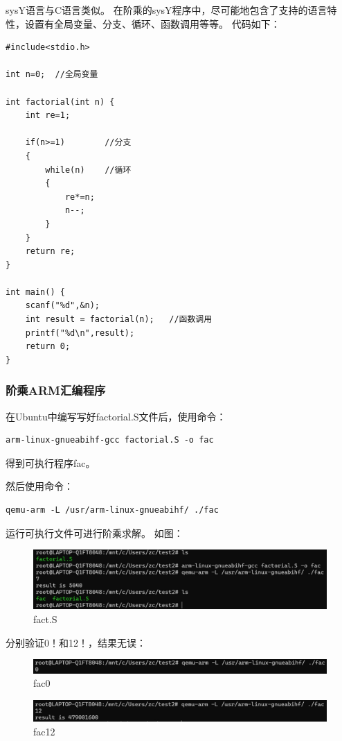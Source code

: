 \documentclass[UTF8,a4paper,10pt]{ctexart}
\begin{document}
sysY语言与C语言类似。
在阶乘的sysY程序中，尽可能地包含了支持的语言特性，设置有全局变量、分支、循环、函数调用等等。
代码如下：
\begin{lstlisting}
#include<stdio.h>

int n=0;  //全局变量

int factorial(int n) {
    int re=1;
    
    if(n>=1)        //分支
    {
        while(n)    //循环
        {
            re*=n;
            n--;
        }
    }
    return re;
}

int main() {
    scanf("%d",&n);         
    int result = factorial(n);   //函数调用
    printf("%d\n",result);
    return 0;
}
\end{lstlisting}

\subsubsection{阶乘ARM汇编程序}


在Ubuntu中编写写好factorial.S文件后，使用命令：


\begin{lstlisting}[frame=trbl]
 arm-linux-gnueabihf-gcc factorial.S -o fac
\end{lstlisting}\par
得到可执行程序fac。

然后使用命令：
\begin{lstlisting}[frame=trbl]
 qemu-arm -L /usr/arm-linux-gnueabihf/ ./fac
\end{lstlisting}\par
运行可执行文件可进行阶乘求解。
如图：
\begin{figure}[H]
    \centering
\includegraphics[width=1.0\textwidth]{img/factorial_arm.png}
    \caption{fact.S}
\end{figure}

分别验证0！和12！，结果无误：
\begin{figure}[H]
    \centering
\includegraphics[width=1.0\textwidth]{img/fac_0.png}
    \caption{fac0}
\end{figure}
\begin{figure}[H]
    \centering
\includegraphics[width=1.0\textwidth]{img/fac_12.png}
    \caption{fac12}
\end{figure}
\end{document}
